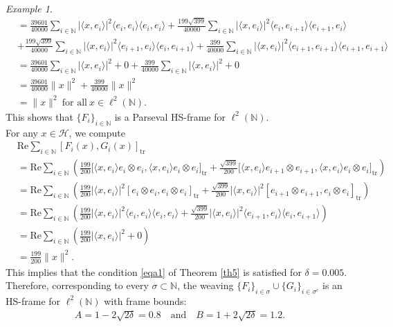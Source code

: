 \documentclass[reqno]{amsart}
\theoremstyle{plain}
\theoremstyle{remark}
\newtheorem{exa}[thm]{Example}
\numberwithin{equation}{section}
\begin{document}
\begin{exa}
\begin{align*}
&=\frac{39601}{40000}\sum_{i \in \mathbb{N}}|\langle x, e_i \rangle |^2 \langle e_i, e_i \rangle \langle e_i, e_i \rangle
+\frac{199\sqrt{399}}{40000}\sum_{i \in \mathbb{N}}|\langle x, e_i \rangle |^2 \langle e_i, e_{i+1} \rangle \langle e_{i+1}, e_i \rangle\\
&+\frac{199\sqrt{399}}{40000}\sum_{i \in \mathbb{N}}|\langle x, e_i \rangle |^2 \langle e_{i+1}, e_i \rangle \langle e_i, e_{i+1} \rangle+\frac{399}{40000}\sum_{i \in \mathbb{N}}|\langle x, e_i \rangle |^2\langle e_{i+1}, e_{i+1} \rangle \langle e_{i+1}, e_{i+1} \rangle\\
&=\frac{39601}{40000}\sum_{i \in \mathbb{N}}|\langle x, e_i \rangle |^2+0+\frac{399}{40000}\sum_{i \in \mathbb{N}}|\langle x, e_i \rangle |^2+0\\
&=\frac{39601}{40000}\|x\|^2 +\frac{399}{40000}\|x\|^2 \\
&=\|x\|^2 \ \text{for all} \ x \in \ell^2(\mathbb{N}).
\end{align*}
This shows that $\{F_i\}_{i \in \mathbb{N}}$ is a Parseval HS-frame for $\ell^2(\mathbb{N})$. \\
For any $x \in \mathcal{H}$, we compute
\begin{align*}
&\text{Re} \sum_{i \in \mathbb{N}} [ F_i(x), G_i(x) ]_{\text{tr}}\\
&=\text{Re} \sum_{i \in \mathbb{N}}\left(\frac{199}{200} \big[\langle x, e_i \rangle e_i \otimes e_i, \langle x, e_i \rangle e_i \otimes e_i \big]_{\text{tr}}+\frac{\sqrt{399}}{200}\big[\langle x, e_i \rangle e_{i+1} \otimes e_{i+1} , \langle x, e_i \rangle e_i \otimes e_i \big]_{\text{tr}}\right)\\
&=\text{Re} \sum_{i \in \mathbb{N}}\left(\frac{199}{200} |\langle x, e_i \rangle |^2[e_i \otimes e_i, e_i \otimes e_i ]_{\text{tr}}+\frac{\sqrt{399}}{200}|\langle x, e_i \rangle |^2[e_{i+1} \otimes e_{i+1} , e_i \otimes e_i ]_{\text{tr}}\right)\\
&=\text{Re} \sum_{i \in \mathbb{N}}\left(\frac{199}{200} |\langle x, e_i \rangle |^2 \langle e_i, e_i \rangle \langle e_i, e_i \rangle+\frac{\sqrt{399}}{200}|\langle x, e_i \rangle |^2  \langle e_{i+1}, e_i \rangle \langle e_i, e_{i+1} \rangle\right)\\
&=\text{Re} \sum_{i \in \mathbb{N}}\left(\frac{199}{200} |\langle x, e_i \rangle |^2 +0\right)\\
&=\frac{199}{200} \|x\|^2.
\end{align*}
This implies that the condition \eqref{eqa1} of Theorem \ref{th5} is satisfied for $\delta=0.005$. Therefore, corresponding to every $\sigma \subset \mathbb{N}$, the weaving $\{F_i\}_{i \in \sigma} \cup \{G_i\}_{i \in \sigma^c}$ is an HS-frame for $\ell^2(\mathbb{N})$ with frame bounds:
\begin{align*}
A = 1 - 2\sqrt{2\delta}=0.8 \quad \text{and} \quad B = 1 + 2\sqrt{2\delta}=1.2.
\end{align*}
\end{exa}
\end{document}
